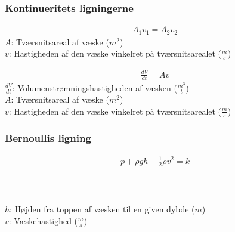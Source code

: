 	\subsubsection{Kontinueritets ligningerne}
		\begin{align}
			A_1v_1=A_2v_2
		\end{align}
		$A$: Tværsnitsareal af væske ($m^2$)\\
		$v$: Hastigheden af den væske vinkelret på tværsnitsarealet ($\frac{m}{s}$)

		\begin{align}
			\frac{dV}{dt}=Av
		\end{align}
		$\frac{dV}{dt}$: Volumenstrømningshastigheden af væsken ($\frac{m^3}{t}$)\\
		$A$: Tværsnitsareal af væske ($m^2$)\\
		$v$: Hastigheden af den væske vinkelret på tværsnitsarealet ($\frac{m}{s}$)

	\subsubsection{Bernoullis ligning}
		\begin{align}
			p+\rho gh+\frac{1}{2}\rho v^2=k
		\end{align}
		\tryk\\
		\densitet\\
		\tyngde\\
		$h$: Højden fra toppen af væsken til en given dybde ($m$)\\
		$v$: Væskehastighed ($\frac{m}{s}$)